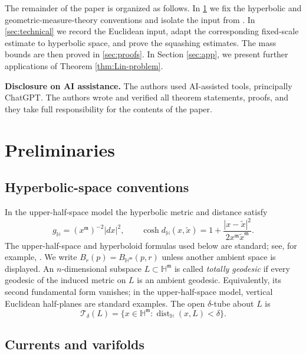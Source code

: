 \documentclass[11pt,reqno]{amsart}
\numberwithin{equation}{section}
\theoremstyle{definition}
\theoremstyle{remark}
\newcommand{\Hyp}{\mathbb H}
\newcommand{\dist}{\operatorname{dist}}
\begin{document}
The remainder of the paper is organized as follows.  In
\cref{sec:preliminaries} we fix the hyperbolic and geometric-measure-theory
conventions and isolate the input from \cite{JiangXie}.  In
\cref{sec:technical} we record the Euclidean input, adapt the corresponding
fixed-scale estimate to hyperbolic space, and prove the squashing estimates.  The
mass bounds are then proved in \cref{sec:proofs}. In Section \ref{sec:app}, we present further applications of Theorem \ref{thm:Lin-problem}.

\vspace{2em}
{\bf Disclosure on AI assistance.} The authors used AI-assisted tools, principally ChatGPT. The authors wrote and verified all theorem statements, proofs, and they take full responsibility for the contents of the paper.

\section{Preliminaries}\label{sec:preliminaries}

\subsection{Hyperbolic-space conventions}

In the upper-half-space model the hyperbolic metric and distance satisfy
\begin{equation}\label{eq:upper-distance}
 g_{\Hyp}=(x^{\mathfrak m})^{-2}|dx|^2,
 \qquad
 \cosh d_{\Hyp}(x,\widetilde x)
 =1+\frac{|x-\widetilde x|^2}
 {2x^{\mathfrak m}\widetilde x^{\mathfrak m}}.
\end{equation}
The upper-half-space and hyperboloid formulas used below are standard; see,
for example, \cite[Chapters~3--4]{Ratcliffe}.
We write $B_r(p)=B_{\Hyp^{\mathfrak m}}(p,r)$ unless another ambient
space is displayed.  An $n$-dimensional subspace $L\subset\Hyp^{\mathfrak m}$
is called \emph{totally geodesic} if every geodesic of the induced metric on
$L$ is an ambient geodesic.  Equivalently, its second fundamental form
vanishes; in the upper-half-space model, vertical Euclidean half-planes are
standard examples.  The open $\delta$-tube about $L$ is
\[
 \mathcal T_\delta(L)
 =\{x\in\Hyp^{\mathfrak m}:\dist_{\Hyp}(x,L)<\delta\}.
\]

\subsection{Currents and varifolds}\label{sec:GMT-prelim}
\end{document}
